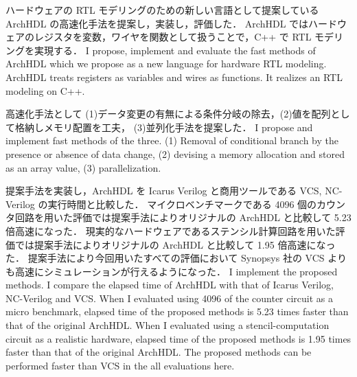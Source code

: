 ハードウェアの RTL モデリングのための新しい言語として提案している ArchHDL の高速化手法を提案し，実装し，評価した．
ArchHDL ではハードウェアのレジスタを変数，ワイヤを関数として扱うことで，C++ で RTL モデリングを実現する．
\fi
I propose, implement and evaluate the fast methods of ArchHDL which we propose as a new language for hardware RTL modeling.
ArchHDL treats registers as variables and wires as functions.
It realizes an RTL modeling on C++.

高速化手法として (1)データ変更の有無による条件分岐の除去，(2)値を配列として格納しメモリ配置を工夫，
(3)並列化手法を提案した．
\fi
I propose and implement fast methods of the three.
(1) Removal of conditional branch by the presence or absence of data change,
(2) devising a memory allocation and stored as an array value,
(3) parallelization.

提案手法を実装し，ArchHDL を Icarus Verilog と商用ツールである VCS, NC-Verilog の実行時間と比較した．
マイクロベンチマークである 4096 個のカウンタ回路を用いた評価では提案手法によりオリジナルの ArchHDL と比較して 5.23 倍高速になった．
現実的なハードウェアであるステンシル計算回路を用いた評価では提案手法によりオリジナルの ArchHDL と比較して 1.95 倍高速になった．
提案手法により今回用いたすべての評価において Synopsys 社の VCS よりも高速にシミュレーションが行えるようになった．
\fi
I implement the proposed methods. I compare the elapsed time of ArchHDL with that of Icarus Verilog, NC-Verilog and VCS.
When I evaluated using 4096 of the counter circuit as a micro benchmark,
elapsed time of the proposed methods is 5.23 times faster than that of the original ArchHDL.
When I evaluated using a stencil-computation circuit as a realistic hardware,
elapsed time of the proposed methods is 1.95 times faster than that of the original ArchHDL.
The proposed methods can be performed faster than VCS in the all evaluations here.